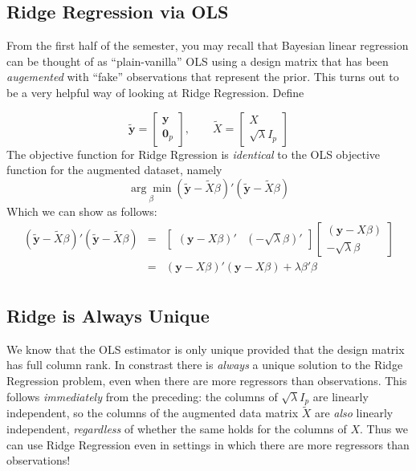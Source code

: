 \subsection{Ridge Regression via OLS}
From the first half of the semester, you may recall that Bayesian linear regression can be thought of as ``plain-vanilla'' OLS using a design matrix that has been \emph{augemented} with ``fake'' observations that represent the prior. This turns out to be a very helpful way of looking at Ridge Regression. Define

$$\widetilde{\textbf{y}} = \left[ \begin{array}
	{c} \textbf{y} \\ \textbf{0}_p
\end{array}\right], \quad \quad \widetilde{X} = \left[ \begin{array}
	{c} X \\ \sqrt{\lambda} I_p
\end{array}\right]$$
The objective function for Ridge Rgression is \emph{identical} to the OLS objective function for the augmented dataset, namely
	$$\underset{\beta}{\arg \min} \left(\widetilde{\mathbf{y}} - \widetilde{X}\beta\right)'\left(\widetilde{\mathbf{y}} - \widetilde{X}\beta\right)$$
Which we can show as follows:
\begin{eqnarray*}
	\left(\widetilde{\mathbf{y}} - \widetilde{X}\beta\right)'\left(\widetilde{\mathbf{y}} - \widetilde{X}\beta\right) &=& \left[\begin{array}
		{cc} (\mathbf{y} - X\beta)' & (-\sqrt{\lambda}\beta)'
	\end{array} \right] \left[\begin{array}
		{c} (\mathbf{y} - X\beta) \\ -\sqrt{\lambda} \beta
	\end{array} \right]\\
		&=& (\mathbf{y} - X\beta)' (\mathbf{y} - X\beta) + \lambda \beta'\beta\\
\end{eqnarray*}

\subsection{Ridge is Always Unique} We know that the OLS estimator is only unique provided that the design matrix has full column rank. In constrast there is \emph{always} a unique solution to the Ridge Regression problem, even when there are more regressors than observations. This follows \emph{immediately} from the preceding: the columns of $\sqrt{\lambda}I_p$ are linearly independent, so the columns of the augmented data matrix $\widetilde{X}$ are \emph{also} linearly independent, \emph{regardless} of whether the same holds for the columns of $X$. Thus we can use Ridge Regression even in settings in which there are more regressors than observations!

